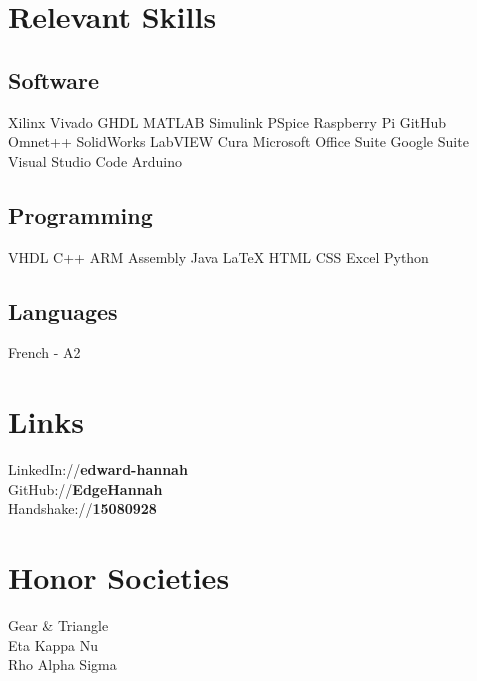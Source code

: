 \documentclass[a4paper, 11pt]{article}
\begin{document}
\begin{minipage}[h]{0.33\textwidth}
\section{Relevant Skills}
\subsection{Software\\}
\hspace{-8pt}\textcolor{location}{Xilinx Vivado \textbullet{} GHDL \textbullet{}  MATLAB Simulink \textbullet{} PSpice \textbullet{}  Raspberry Pi \textbullet{} GitHub \textbullet{} Omnet++ \textbullet{} SolidWorks \textbullet{} LabVIEW \textbullet{} Cura \textbullet{} Microsoft Office Suite \textbullet{} Google Suite \textbullet{} Visual Studio Code \textbullet{}  Arduino}\\
\subsection{Programming\\}
\hspace{-6pt}\textcolor{location}{VHDL \textbullet{} C++ \textbullet{} ARM Assembly \textbullet{} Java \textbullet{} \LaTeX \textbullet{} HTML \textbullet{} CSS \textbullet{} Excel \textbullet{} Python}\\
\subsection{Languages\\}
\hspace{-6pt}\textcolor{location}{French - A2}\\
\section{Links}
LinkedIn://\textbf{\textcolor{date}{edward-hannah}} \\
GitHub://\textbf{\textcolor{date}{EdgeHannah}} \\
Handshake://\textbf{\textcolor{date}{15080928}} \\
\section{Honor Societies}
\textcolor{location}{
Gear \& Triangle\\
Eta Kappa Nu\\
Rho Alpha Sigma\\}
\end{minipage}
\end{document}
